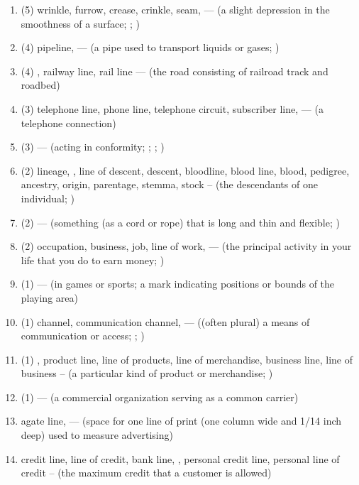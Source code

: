 \documentclass[a4paper,landscape,headrule,footrule,xetex]{foils}
\begin{document}
\begin{enumerate}
\item (5) wrinkle, furrow, crease, crinkle, seam,  --- (a slight depression in the smoothness of a surface; ; )
\item (4) pipeline,  --- (a pipe used to transport liquids or gases; )
\item (4) , railway line, rail line --- (the road consisting of railroad track and roadbed)
\item (3) telephone line, phone line, telephone circuit, subscriber line,  --- (a telephone connection)
\item (3)  --- (acting in conformity; ; ; )
\item (2) lineage, , line of descent, descent, bloodline, blood line, blood, pedigree, ancestry, origin, parentage, stemma, stock -- (the descendants of one individual; )
\item (2)  --- (something (as a cord or rope) that is long and thin and flexible; )
\item (2) occupation, business, job, line of work,  --- (the principal activity in your life that you do to earn money; )
\item (1)  --- (in games or sports; a mark indicating positions or bounds of the playing area)
\item (1) channel, communication channel,  --- ((often plural) a means of communication or access; ; )
\item (1) , product line, line of products, line of merchandise, business line, line of business -- (a particular kind of product or merchandise; )
\item (1)  --- (a commercial organization serving as a common carrier)
\item agate line,  --- (space for one line of print (one column wide and 1/14 inch deep) used to measure advertising)
\item credit line, line of credit, bank line, , personal credit line, personal line of credit -- (the maximum credit that a customer is allowed)

\end{enumerate}
\end{document}
